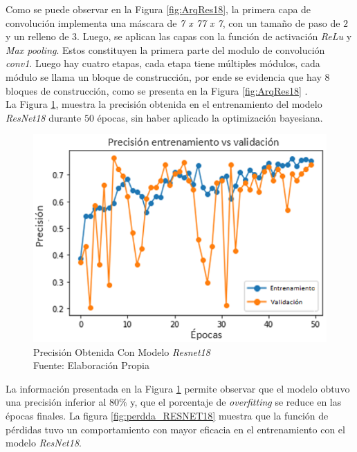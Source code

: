 Como se puede observar en la Figura \ref{fig:ArqRes18}, la primera capa de convolución implementa una máscara de \textit{7 x 77 x 7}, con un tamaño de paso de $2$ y un relleno de $3$. Luego, se aplican las capas con la función de activación \textit{ReLu} y \textit{Max pooling}. Estos constituyen la primera parte del modulo de convolución \textit{conv1}. Luego hay cuatro etapas, cada etapa tiene múltiples módulos, cada módulo se llama un bloque de construcción, por ende se evidencia que hay 8 bloques de construcción, como se presenta en la Figura \ref{fig:ArqRes18} \cite{ref_5}.\\				
	
La Figura \ref{fig:preci_RESNET18}, muestra la precisión obtenida en el entrenamiento del modelo \textit{ResNet18} durante $50$ épocas, sin haber aplicado la optimización bayesiana.

\vspace{0.5cm}

\begin{figure}[ht]
	\centering
	\includegraphics[scale=0.7]{Figs/109.png}
	\caption{Precisión Obtenida Con Modelo \textit{Resnet18} \\ Fuente: Elaboración Propia}
	\label{fig:preci_RESNET18}
\end{figure}


\vspace{0.5cm}

La información presentada en la Figura \ref{fig:preci_RESNET18} permite observar que el modelo obtuvo una precisión inferior al $80\%$ y, que el porcentaje de \textit{overfitting} se reduce en las épocas finales. La figura \ref{fig:perdda_RESNET18} muestra que la función de pérdidas tuvo un comportamiento con mayor eficacia en el entrenamiento con el modelo \textit{ResNet18}.

